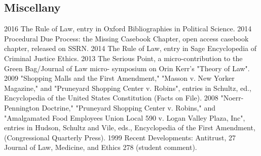 \documentclass[letterpaper]{moderncv}
\begin{document}
\subsection{Miscellany}
\cvitem
{2016}
{The Rule of Law, entry in Oxford Bibliographies in Political Science.}
\vspace{1mm}
\cvitem
{2014}
{Procedural Due Process: the Missing Casebook Chapter, open access casebook chapter, released on SSRN.}
\vspace{1mm}
\cvitem
{2014}
{The Rule of Law, entry in Sage Encyclopedia of Criminal Justice Ethics.}
\vspace{1mm}
\cvitem
{2013}
{The Serious Point, a micro-contribution to the Green Bag/Journal of Law micro- symposium on Orin Kerr's "Theory of Law".}
\vspace{1mm}
\cvitem
{2009}
{"Shopping Malls and the First Amendment," "Masson v. New Yorker Magazine," and "Pruneyard Shopping Center v. Robins", entries in Schultz, ed., Encyclopedia of the United States Constitution (Facts on File).}
\vspace{1mm}
\cvitem
{2008}
{"Noerr-Pennington Doctrine," "Pruneyard Shopping Center v. Robins," and "Amalgamated Food Employees Union Local 590 v. Logan Valley Plaza, Inc", entries in Hudson, Schultz and Vile, eds., Encyclopedia of the First Amendment, (Congressional Quarterly Press).}
\vspace{1mm}
\cvitem
{1999}
{Recent Developments: Antitrust, 27 Journal of Law, Medicine, and Ethics 278 (student comment).}
\vspace{1mm}
\end{document}

